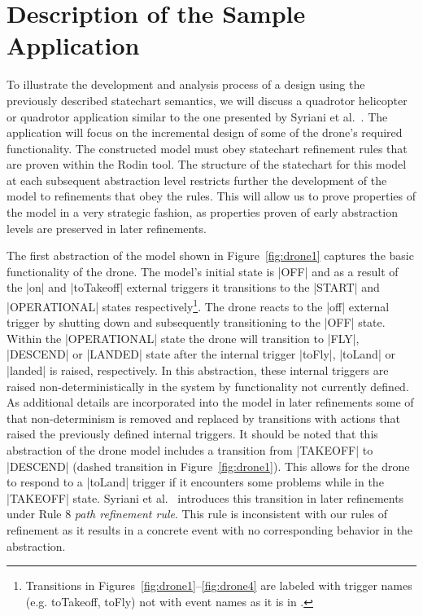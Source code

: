 \section{Description of the Sample Application}
\label{sec:descr-sample-appl}

To illustrate the development and analysis process of a design using the previously described 
statechart semantics, we will discuss a quadrotor helicopter or quadrotor application similar to 
the one presented by Syriani et al.~\cite{Syriani_2019}. The application will focus on the incremental 
design of some of the drone's required functionality.
The constructed model must obey statechart refinement rules that are proven within the Rodin tool.
The structure of the statechart for this model at each subsequent abstraction level restricts further the
development of the model to refinements that obey the rules. This will allow us to prove properties 
of the model in a very strategic fashion, as properties proven of early abstraction levels 
are preserved in later refinements.

The first abstraction of the model shown in Figure~\ref{fig:drone1} captures the basic 
functionality of the drone. The model's initial state is |OFF| and as a result of the |on| and 
|toTakeoff| external triggers it transitions to the |START| and |OPERATIONAL| states 
respectively\footnote{Transitions in Figures~\ref{fig:drone1}--\ref{fig:drone4} are labeled with trigger names
(e.g. toTakeoff, toFly) not with event names as it is in \UMLB.}. 
The drone reacts to the |off| external trigger by shutting down and subsequently transitioning to the |OFF| state.
Within the |OPERATIONAL| state the drone will transition to |FLY|, |DESCEND| or |LANDED| 
state after the internal trigger |toFly|, |toLand| or |landed| is raised, respectively. 
In this abstraction, these internal triggers are raised non-deterministically 
in the system by functionality not currently defined.
As additional details are incorporated into the model in later refinements some of that non-determinism is 
removed and replaced by transitions with actions that raised the previously defined internal triggers.
It should be noted that this abstraction of the drone model includes a transition 
from |TAKEOFF| to |DESCEND| (dashed transition in Figure~\ref{fig:drone1}). 
This allows for the drone to respond to a |toLand| trigger if it encounters some 
problems while in the |TAKEOFF| state. Syriani et al.~\cite{Syriani_2019} introduces this transition 
in later refinements under Rule 8 \emph{path refinement rule}. This rule is inconsistent with our rules 
of refinement as it results in a concrete event with no corresponding 
behavior in the abstraction.

